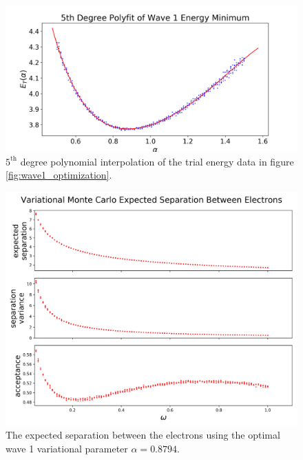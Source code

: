 \documentclass[nofootinbib,reprint,english]{revtex4-1}
\begin{document}
\begin{figure}
\centering
\includegraphics[scale=0.34]{../results/wave1/energy_minimum_deg5polyfit_2.png}
\caption{\(5^\text{th}\) degree polynomial interpolation of the trial energy data in figure \ref{fig:wave1_optimization}.}\label{fig:wave1_polyfit}
\end{figure}

\begin{figure}
\centering
\includegraphics[scale=0.34]{../results/wave1/expected_separation_3.png}
\caption{The expected separation between the electrons using the optimal wave 1 variational parameter \(\alpha=0.8794\).}\label{fig:wave1_separation}
\end{figure}
\end{document}
